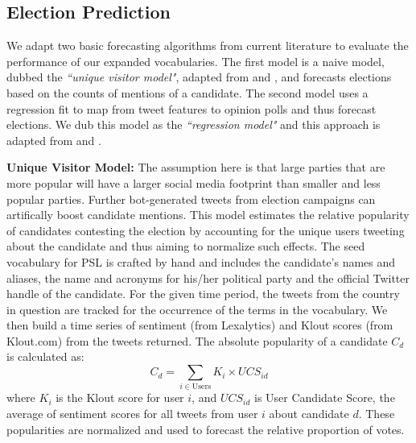 \subsection{Election Prediction}

We adapt two basic forecasting algorithms from current literature to evaluate the
performance of our expanded vocabularies.
The first model is a naive model, dubbed the
\emph{``unique visitor model"}, adapted from \cite{saez2011total} and \cite{tumasjan2010predicting},
and forecasts elections based on the counts of mentions of a candidate. 
The second model uses a regression fit to map from tweet features to opinion polls and thus forecast elections.
We dub this model as the \emph{``regression model"} and this approach
is adapted from \cite{bermingham2011using} and \cite{o2010tweets}.

\noindent
{\bf Unique Visitor Model:}
The assumption here is that
large parties that are more popular will have a larger social media footprint than smaller and less popular parties. 
Further bot-generated tweets from election campaigns can artifically boost candidate mentions.
This model estimates the relative popularity of candidates contesting the election by accounting for the unique
users tweeting about the candidate and thus aiming to normalize such effects.
The seed vocabulary for PSL is crafted by hand and includes the candidate's names and aliases, the name and acronyms for his/her political party and the official Twitter handle of the candidate.
For the given time period, the tweets from the country in question are tracked for the occurrence of the terms in the vocabulary.
We then build a time series of sentiment (from Lexalytics) and Klout scores (from Klout.com) from the tweets returned.
The absolute popularity of a candidate $C_d$ is calculated as:
\begin{equation}
{C_d} = \sum_{i \in \textrm{Users}} K_i \times UCS_{id}
\end{equation}
\noindent
where $K_i$ is the Klout score for user $i$, and $UCS_{id}$ is User Candidate Score, the average of sentiment scores for all tweets from user $i$ about candidate $d$. These popularities are normalized and used to forecast the relative proportion of votes.

